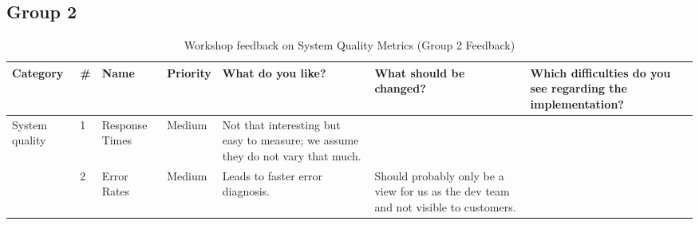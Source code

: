 \documentclass[
	english,
	ruledheaders=section,%
	class=report,%
	thesis={type=bachelor},%
	accentcolor=1b,%
	custommargins=true,%
	marginpar=false,%
	parskip=half-,%
	fontsize=11pt,%
	DIV=14,
]{tudapub}
\begin{document}
\clearpage %

\subsection*{Group 2}

\begin{table}
    \centering
    \small 
    \caption{Workshop feedback on System Quality Metrics (Group 2 Feedback)}
    \label{tab:system_quality_g2}
    \begin{tabularx}{\textheight}{p{2.2cm} l >{\RaggedRight\arraybackslash}X l >{\RaggedRight\arraybackslash}X >{\RaggedRight\arraybackslash}X >{\RaggedRight\arraybackslash}X}
        \toprule
        \textbf{Category} & \textbf{\#} & \textbf{Name} & \textbf{Priority} & \textbf{What do you like?} & \textbf{What should be changed?} & \textbf{Which difficulties do you see regarding the implementation?} \\
        \midrule
        
        \multirow{2}{=}{System quality} 
        & 1 & Response Times & Medium & Not that interesting but easy to measure; we assume they do not vary that much. & & \\
        \cmidrule(l){2-7}
        & 2 & Error Rates & Medium & Leads to faster error diagnosis. & Should probably only be a view for us as the dev team and not visible to customers. & \\
        \bottomrule
    \end{tabularx}
\end{table}
\end{document}
